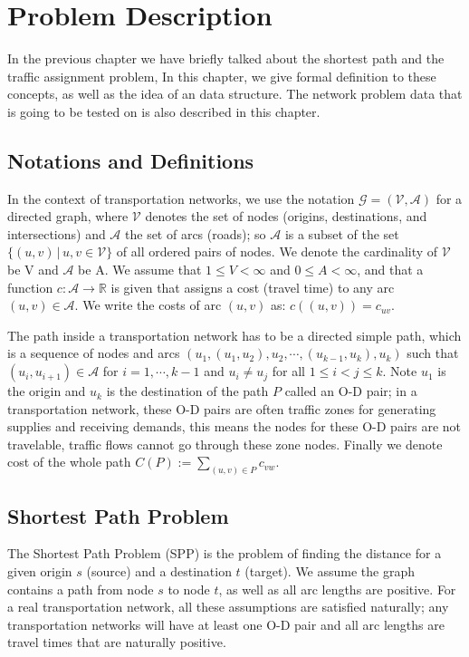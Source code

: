 \chapter{Problem Description}
In the previous chapter we have briefly talked about the
shortest path and the traffic assignment problem,
In this chapter, we give formal definition to these concepts,
as well as the idea of an data structure.
The network problem data that is going to be tested on is also 
described in this chapter.
\section{Notations and Definitions}

In the context of transportation networks,
we use the notation $ \mathcal{G} = ( \mathcal{V}, \mathcal{A} ) $ for a directed graph,
where $ \mathcal{V} $ denotes the set of nodes (origins, destinations, and intersections)
and $ \mathcal{A} $ the set of arcs (roads);
so $ \mathcal{A} $ is a subset of the set $ \{ (u, v)\, | \, u, v \in \mathcal{V} \} $ of all ordered pairs of nodes.
We denote the cardinality of $ \mathcal{V} $ be V and $ \mathcal{A} $ be A.
We assume that $ 1 \leq V < \infty $ and $ 0 \leq A < \infty $,
and that a function $ c : \mathcal{A} \rightarrow \mathbb{R} $ is given that assigns a cost (travel time) to any arc $ (u,v) \in \mathcal{A} $.
We write the costs of arc $(u, v)$ as: $ c((u, v)) = c_{uv} $.

The path inside a transportation network has to be a directed simple path, 
which is a sequence of nodes and arcs $ (u_1, (u_1, u_2), u_2, \cdots , (u_{k-1}, u_k), u_k ) $
such that $ (u_i, u_{i+1}) \in \mathcal{A}$ for $i = 1,\cdots,k-1$ and $u_i \neq u_j$ for all $ 1 \leq i < j \leq k$.
Note $u_1$ is the origin and $u_k$ is the destination of the path $P$ called an O-D pair;
in a transportation network,
these O-D pairs are often traffic zones for generating supplies and receiving demands,
this means the nodes for these O-D pairs are not travelable,
traffic flows cannot go through these zone nodes.
Finally we denote cost of the whole path $C(P) := \sum_{(u,v)\in P} c_{vw}$.

\section{Shortest Path Problem}
The Shortest Path Problem (SPP) is the problem of finding the distance for a given origin $s$ (source) and a destination $t$ (target).
We assume the graph contains a path from node $s$  to node $t$, as well as all arc lengths are positive.
For a real transportation network, all these assumptions are satisfied naturally; any transportation networks will have at least one O-D pair and
all arc lengths are travel times that are naturally positive.

